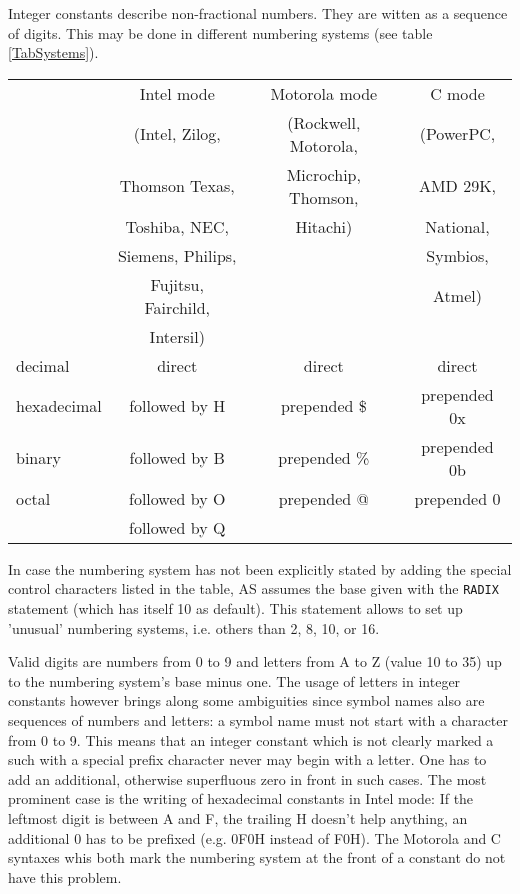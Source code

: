 \documentclass[12pt,twoside]{report}
\begin{document}
Integer constants describe non-fractional numbers.  They are witten as a
sequence of digits.  This may be done in different numbering systems (see
table \ref{TabSystems}).
\par
\begin{table*}[htb]
\begin{center}\begin{tabular}{|l|c|c|c|}
\hline
                & Intel mode        &  Motorola mode       &  C mode    \\
                & (Intel, Zilog,    & (Rockwell, Motorola, &  (PowerPC, \\
                &  Thomson Texas,   & Microchip, Thomson,  &  AMD 29K,  \\
                &  Toshiba, NEC,    & Hitachi)             &  National, \\
                &  Siemens, Philips, &                     &  Symbios,  \\
                & Fujitsu, Fairchild, &                    &  Atmel)    \\
                & Intersil)         &                      &            \\
\hline
\hline
decimal         & direct              & direct         &   direct \\
hexadecimal     & followed by H       & prepended \$   & prepended 0x \\
binary          & followed by B       & prepended \%   & prepended 0b \\
octal           & followed by O       & prepended @    & prepended 0 \\
                & followed by Q       &                &         \\
\hline
\end{tabular}\end{center}
\caption{Possible Numbering Systems\label{TabSystems}}
\end{table*}
In case the numbering system has not been explicitly stated by adding the
special control characters listed in the table, AS assumes the base given
with the {\tt RADIX} statement (which has itself 10 as default).  This
statement allows to set up 'unusual' numbering systems, i.e. others than
2, 8, 10, or 16.

Valid digits are numbers from 0 to 9 and letters from A to Z (value 10 to
35) up to the numbering system's base minus one. The usage of letters in
integer constants however brings along some ambiguities since symbol names
also are sequences of numbers and letters: a symbol name must not start
with a character from 0 to 9.  This means that an integer constant which
is not clearly marked a such with a special prefix character never may
begin with a letter.  One has to add an additional, otherwise superfluous
zero in front in such cases.  The most prominent case is the writing of
hexadecimal constants in Intel mode:  If the leftmost digit is between A
and F, the trailing H doesn't help anything, an additional 0 has to be
prefixed (e.g. 0F0H instead of F0H).  The Motorola and C syntaxes whis
both mark the numbering system at the front of a constant do not have this
problem.
\end{document}
